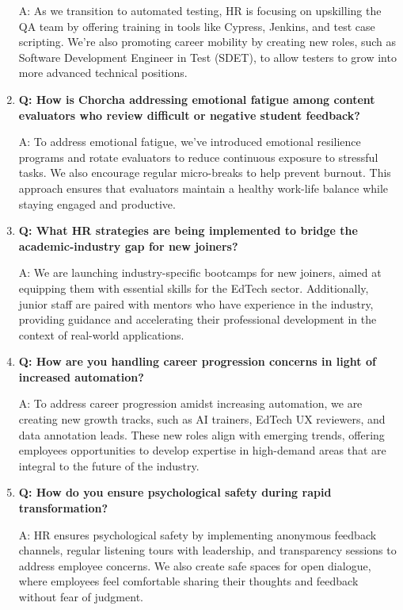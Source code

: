 \documentclass[12pt,a4paper,oneside]{book}
\begin{document}
\begin{enumerate}
A: As we transition to automated testing, HR is focusing on upskilling the QA team by offering training in tools like Cypress, Jenkins, and test case scripting. We’re also promoting career mobility by creating new roles, such as Software Development Engineer in Test (SDET), to allow testers to grow into more advanced technical positions.

\item \textbf{Q: How is Chorcha addressing emotional fatigue among content evaluators who review difficult or negative student feedback?} 

A: To address emotional fatigue, we’ve introduced emotional resilience programs and rotate evaluators to reduce continuous exposure to stressful tasks. We also encourage regular micro-breaks to help prevent burnout. This approach ensures that evaluators maintain a healthy work-life balance while staying engaged and productive.

\item \textbf{Q: What HR strategies are being implemented to bridge the academic-industry gap for new joiners?} 

A: We are launching industry-specific bootcamps for new joiners, aimed at equipping them with essential skills for the EdTech sector. Additionally, junior staff are paired with mentors who have experience in the industry, providing guidance and accelerating their professional development in the context of real-world applications.

\item \textbf{Q: How are you handling career progression concerns in light of increased automation?} 

A: To address career progression amidst increasing automation, we are creating new growth tracks, such as AI trainers, EdTech UX reviewers, and data annotation leads. These new roles align with emerging trends, offering employees opportunities to develop expertise in high-demand areas that are integral to the future of the industry.

\item \textbf{Q: How do you ensure psychological safety during rapid transformation?} 

A: HR ensures psychological safety by implementing anonymous feedback channels, regular listening tours with leadership, and transparency sessions to address employee concerns. We also create safe spaces for open dialogue, where employees feel comfortable sharing their thoughts and feedback without fear of judgment.

\end{enumerate}
\end{document}
